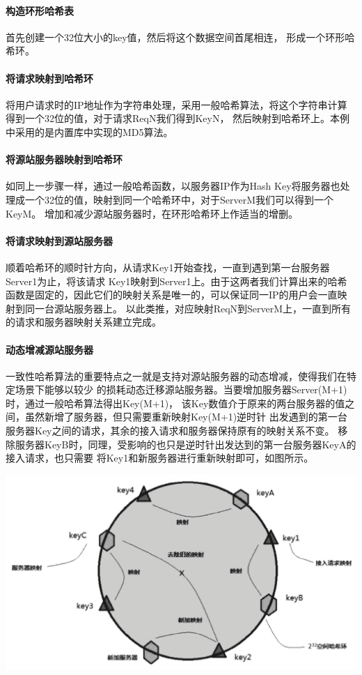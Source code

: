 \documentclass[twoside]{CUGThesis}
\begin{document}
	\paragraph{构造环形哈希表}
	首先创建一个32位大小的key值，然后将这个数据空间首尾相连，
	形成一个环形哈希环。
	\paragraph{将请求映射到哈希环}
	将用户请求时的IP地址作为字符串处理，采用一般哈希算法，将这个字符串计算得到一个32位的值，对于请求ReqN我们得到KeyN，
	然后映射到哈希环上。本例中采用的是内置库中实现的MD5算法。
	\paragraph{将源站服务器映射到哈希环}
	如同上一步骤一样，通过一般哈希函数，以服务器IP作为Hash Key将服务器也处理成一个32位的值，映射到同一个哈希环中，对于ServerM我们可以得到一个KeyM。
	增加和减少源站服务器时，在环形哈希环上作适当的增删。
	\paragraph{将请求映射到源站服务器}
	顺着哈希环的顺时针方向，从请求Key1开始查找，一直到遇到第一台服务器Server1为止，将该请求
	Key1映射到Server1上。由于这两者我们计算出来的哈希函数是固定的，因此它们的映射关系是唯一的，可以保证同一IP的用户会一直映射到同一台源站服务器上。
	以此类推，对应映射ReqN到ServerM上，一直到所有的请求和服务器映射关系建立完成。
	\paragraph{动态增减源站服务器}
	一致性哈希算法的重要特点之一就是支持对源站服务器的动态增减，使得我们在特定场景下能够以较少
	的损耗动态迁移源站服务器。当要增加服务器Server(M+1)时，通过一般哈希算法得出Key(M+1)，
	该Key数值介于原来的两台服务器的值之间，虽然新增了服务器，但只需要重新映射Key(M+1)逆时针
	出发遇到的第一台服务器Key之间的请求，其余的接入请求和服务器保持原有的映射关系不变。
	移除服务器KeyB时，同理，受影响的也只是逆时针出发达到的第一台服务器KeyA的接入请求，也只需要
	将Key1和新服务器进行重新映射即可，如图所示。\par
	\includegraphics[scale=0.33]{Figures/hash_circle.jpg}
\end{document}
